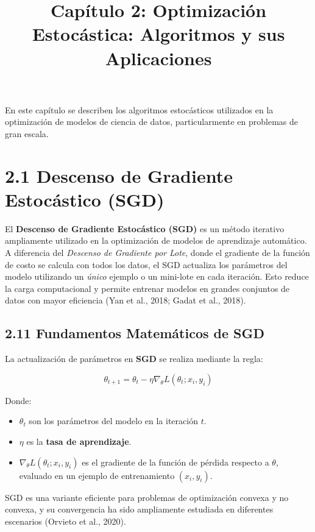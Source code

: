 \documentclass{article}
\title{\textbf{Capítulo 2: Optimización Estocástica: Algoritmos y sus Aplicaciones}}
\author{}
\date{}
\begin{document}
	
\maketitle
	En este capítulo se describen los algoritmos estocásticos utilizados en la optimización de modelos de ciencia de datos, particularmente en problemas de gran escala.
	
	\section*{2.1 Descenso de Gradiente Estocástico (SGD)}
	
     El \textbf{Descenso de Gradiente Estoc\'astico (SGD)} es un m\'etodo iterativo ampliamente utilizado en la optimizaci\'on de modelos de aprendizaje autom\'atico. A diferencia del \textit{Descenso de Gradiente por Lote}, donde el gradiente de la funci\'on de costo se calcula con todos los datos, el SGD actualiza los par\'ametros del modelo utilizando un \textit{\'unico} ejemplo o un mini-lote en cada iteraci\'on. Esto reduce la carga computacional y permite entrenar modelos en grandes conjuntos de datos con mayor eficiencia (Yan et al., 2018; Gadat et al., 2018).
     
     \subsection*{2.11 Fundamentos Matem\'aticos de SGD}
     
     La actualizaci\'on de par\'ametros en \textbf{SGD} se realiza mediante la regla:
     
     \begin{equation}
     	\theta_{t+1} = \theta_t - \eta \nabla_{\theta} L(\theta_t; x_i, y_i)
     \end{equation}
     
     Donde:
     \begin{itemize}
     	\item $\theta_t$ son los par\'ametros del modelo en la iteraci\'on $t$.
     	\item $\eta$ es la \textbf{tasa de aprendizaje}.
     	\item $\nabla_{\theta} L(\theta_t; x_i, y_i)$ es el gradiente de la funci\'on de p\'erdida respecto a $\theta$, evaluado en un ejemplo de entrenamiento $(x_i, y_i)$.
     \end{itemize}
     
     SGD es una variante eficiente para problemas de optimizaci\'on convexa y no convexa, y su convergencia ha sido ampliamente estudiada en diferentes escenarios (Orvieto et al., 2020).
     
\end{document}
